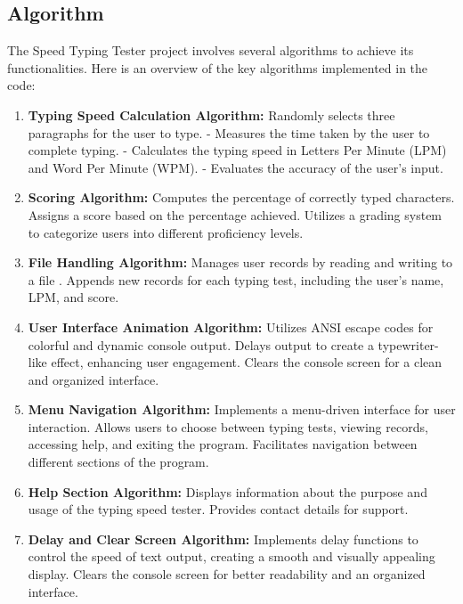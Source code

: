 \subsection{Algorithm}
The Speed Typing Tester project involves several algorithms to achieve its functionalities. Here is an overview of the key algorithms implemented in the code:

\begin{enumerate}
    \item \textbf{Typing Speed Calculation Algorithm:
}   Randomly selects three paragraphs for the user to type.
   - Measures the time taken by the user to complete typing.
   - Calculates the typing speed in Letters Per Minute (LPM) and Word Per Minute (WPM).
   - Evaluates the accuracy of the user's input.

\item \textbf{ Scoring Algorithm:
}    Computes the percentage of correctly typed characters.
   Assigns a score based on the percentage achieved.
    Utilizes a grading system to categorize users into different proficiency levels.

\item\textbf{File Handling Algorithm:
}    Manages user records by reading and writing to a file .
    Appends new records for each typing test, including the user's name, LPM, and score.

\item\textbf{User Interface Animation Algorithm:
}    Utilizes ANSI escape codes for colorful and dynamic console output.
   Delays output to create a typewriter-like effect, enhancing user engagement.
    Clears the console screen for a clean and organized interface.

\item\textbf{Menu Navigation Algorithm:
} Implements a menu-driven interface for user interaction.
   Allows users to choose between typing tests, viewing records, accessing help, and exiting the program.
    Facilitates navigation between different sections of the program.

\item\textbf{Help Section Algorithm:
}    Displays information about the purpose and usage of the typing speed tester.
    Provides contact details for support.

\item\textbf{Delay and Clear Screen Algorithm:
}   Implements delay functions to control the speed of text output, creating a smooth and visually appealing display.
    Clears the console screen for better readability and an organized interface.

\end{enumerate}



